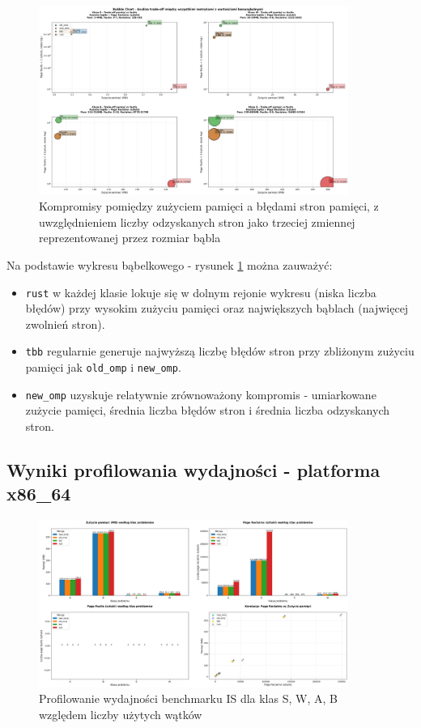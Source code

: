 \begin{figure}[!h]
    \centering
    \includegraphics[width=0.9\textwidth]{analiza/images/parallel/is/arm/chart_06_bubble_chart.png}
    \caption{Kompromisy  pomiędzy zużyciem pamięci a błędami stron pamięci, z uwzględnieniem liczby odzyskanych stron jako trzeciej zmiennej reprezentowanej przez rozmiar bąbla}
    \label{is_kompromisy_pamiec_bledy}
\end{figure}
Na podstawie wykresu bąbelkowego - rysunek \ref{is_kompromisy_pamiec_bledy} można zauważyć:
\begin{itemize}
    \item \texttt{rust} w każdej klasie lokuje się w dolnym rejonie wykresu (niska liczba błędów) przy wysokim zużyciu pamięci oraz największych bąblach (najwięcej zwolnień stron).
    \item \texttt{tbb} regularnie generuje najwyższą liczbę błędów stron przy zbliżonym zużyciu pamięci jak \texttt{old\_omp} i \texttt{new\_omp}.
    \item \texttt{new\_omp} uzyskuje relatywnie zrównoważony kompromis - umiarkowane zużycie pamięci, średnia liczba błędów stron i średnia liczba odzyskanych stron.
\end{itemize}
\subsection{Wyniki profilowania wydajności - platforma x86\_64}
\begin{figure}[H]
    \centering
    \includegraphics[width=0.9\textwidth]{analiza/images/parallel/is/x86/chart_01_memory_comparison.png}
    \caption{Profilowanie wydajności benchmarku IS dla klas S, W, A, B względem liczby użytych wątków}
    \label{is_porownanie_zuzycia_pamieci_x86}
\end{figure}


